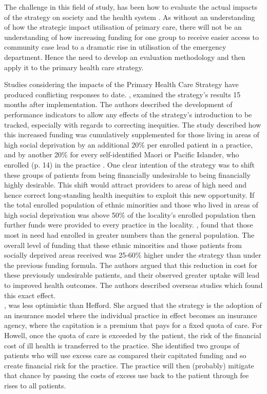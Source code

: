\documentclass[11pt,a4paper]{article}
\begin{document}
The challenge in this field of study, has been how to evaluate the actual impacts of the strategy on society and the health system \citep{howell2005restructuring}. As without an understanding of how the strategic impact utilisation of primary care, there will not be an understanding of how increasing funding for one group to receive easier access to community case lead to a dramatic rise in utilisation of the emergency department. Hence the need to develop an evaluation methodology and then apply it to the primary health care strategy.

Studies considering the impacts of the Primary Health Care Strategy have produced conflicting responses to date. \citet{hefford2005reducing}, examined the strategy's results 15 months after implementation. The authors described the development of performance indicators to allow any effects of the strategy's introduction to be tracked, especially with regards to correcting inequities. The study described  how this increased funding was cumulatively supplemented for those living in areas of high social deprivation by an additional 20\% per enrolled patient in a practice, and by another 20\% for every self-identified Maori or Pacific Islander, who enrolled (p. 14) in the practice \citep{hefford2005reducing}. One clear intention of the strategy was to shift these groups of patients from being financially undesirable to being financially highly desirable. This shift would attract providers to areas of high need and hence correct long-standing health inequities to exploit this new opportunity. If the total enrolled population of ethnic minorities and those who lived in areas of high social deprivation was above 50\% of the locality's enrolled population then further funds were provided to every practice in the locality. \citet{hefford2005reducing}, found that those most in need had enrolled in greater numbers than the general population. The overall level of funding that these ethnic minorities and those patients from socially deprived areas  received was 25-60\% higher under the strategy than under the previous funding formula. The authors argued that this reduction in cost for these previously undesirable patients, and their observed greater uptake will lead to improved health outcomes. The authors described overseas studies which found this exact effect.\\

\citet{howell2005restructuring}, was less optimistic than Hefford. She argued that the strategy is the adoption of an insurance model where the individual practice in effect becomes an insurance agency, where the capitation is a premium that pays for a fixed quota of care. For Howell, once the quota of care is exceeded by the patient, the risk of the financial cost of ill health is transferred to the practice. She identified two groups of patients who will use excess care as compared their capitated funding and so create financial risk for the practice. The practice will then (probably) mitigate that chance by passing the costs of excess use back to the patient through fee rises to all patients.\\
\end{document}
